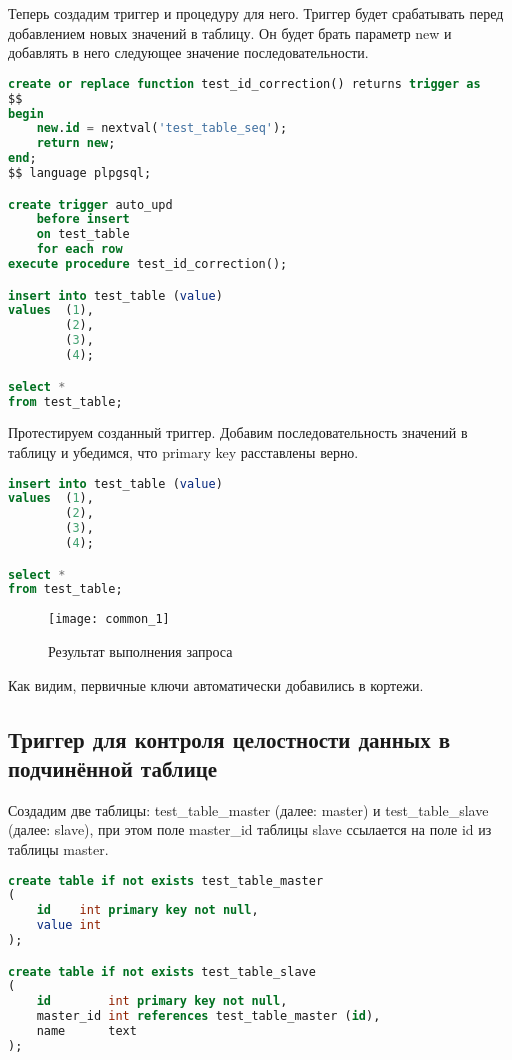 Теперь создадим триггер и процедуру для него. Триггер будет срабатывать перед добавлением новых значений в таблицу. Он будет брать параметр new и добавлять в него следующее значение последовательности.

\begin{lstlisting}[caption=Создание триггера и процедуры для него, language=SQL]
create or replace function test_id_correction() returns trigger as
$$
begin
	new.id = nextval('test_table_seq');
	return new;
end;
$$ language plpgsql;

create trigger auto_upd
	before insert
	on test_table
	for each row
execute procedure test_id_correction();

insert into test_table (value)
values  (1),
		(2),
		(3),
		(4);

select *
from test_table;
\end{lstlisting}

Протестируем созданный триггер. Добавим последовательность значений в таблицу и убедимся, что primary key расставлены верно.

\begin{lstlisting}[caption=Добавление новых значений в таблицу, language=SQL]
insert into test_table (value)
values  (1),
		(2),
		(3),
		(4);

select *
from test_table;
\end{lstlisting}

\begin{figure}[H]
	\begin{center}
		\texttt{[image: common\_1]}
		\caption{Результат выполнения запроса} 
		\label{pic:1} %
	\end{center}
\end{figure}
Как видим, первичные ключи автоматически добавились в кортежи.

\subsection{Триггер для контроля целостности данных в подчинённой таблице}

Создадим две таблицы: test\_table\_master (далее: master) и test\_table\_slave (далее: slave), при этом поле master\_id таблицы slave ссылается на поле id из таблицы master.

\begin{lstlisting}[caption=Создание тестовых таблиц, language=SQL]
create table if not exists test_table_master
(
	id    int primary key not null,
	value int
);

create table if not exists test_table_slave
(
	id        int primary key not null,
	master_id int references test_table_master (id),
	name      text
);
\end{lstlisting}

